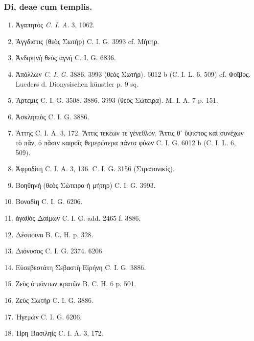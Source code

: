 \documentclass[a4paper, 11pt, oneside, polutonikogreek, german]{article}
\begin{document}
\subsubsection{Di, deae cum templis.}
\begin{enumerate}
\item Ἀγαπητός \emph{C. I. A.} 3, 1062.

\item Ἄγγδιστις (θεὸς Σωτήρ) C. I. G. 3993 cf. Μήτηρ.

\item Ἀνδιρηνὴ θεὸς ἁγνή C. I. G. 6836.

\item Ἀπόλλων \emph{C. I. G.} 3886. 3993 (θεὸς Σωτήρ). 6012 b (C. I. L. 6, 509) cf. Φοῖβος. Lueders d. Dionysischen künstler p. 9 sq.

\item Ἄρτεμις C. I. G. 3508. 3886. 3993 (θεὸς Σώτειρα). M. I. A. 7 p. 151.

\item Ἀσκληπιός C. I. G. 3886.

\item Ἄττης C. I. A. 3, 172. Ἄττις τεκέων τε γένεθλον, Ἄττις θ᾽ ὕψιστος καὶ συνέχων τὸ πᾶν, ὁ πᾶσιν καιροῖς θεμερώτερα πάντα φύων C. I. G. 6012 b (C. I. L. 6, 509).

\item Ἀφροδίτη C. I. A. 3, 136. C. I. G. 3156 (Στρατονικίς).

\item Βοηθηνή (θεὸς Σώτειρα ἡ μήτηρ) C. I. G. 3993.

\item Βοναδίη C. I. G. 6206.

\item ἀγαθὸς Δαίμων C. I. G. add. 2465 f. 3886.

\item Δέσποινα B. C. H. p. 328.

\item Διόνυσος C. I. G. 2374. 6206.

\item Εὐσεβεστάτη Σεβαστὴ Εἰρήνη C. I. G. 3886.

\item Ζεὺς ὁ πάντων κρατῶν B. C. H. 6 p. 501.

\item Ζεὺς Σωτήρ C. I. G. 3886.

\item Ἡγεμών C. I. G. 6206.

\item Ἡρη Βασιληίς C. I. A. 3, 172.


\end{enumerate}
\end{document}
